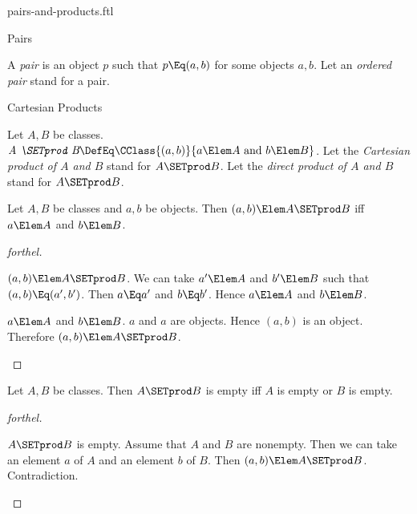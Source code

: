 \documentclass{stex}
\begin{document}
\begin{smodule}{pairs-and-products.ftl}

\begin{sfragment}{Pairs}
  \begin{definition}[forthel,for=ordered pair]
    A \emph{pair} is an object $p$ such that $p \Eq (a, b)$ for some objects $a, b$.
    Let an \emph{ordered pair} stand for a pair.
  \end{definition}
\end{sfragment}

\begin{sfragment}{Cartesian Products}
  \begin{definition}[forthel,for={SETprod,Cartesian product,direct product}]
    Let $A, B$ be classes.
    $\emph{A \SETprod B} \DefEq \CClass{(a, b)}{a \Elem A\text{ and }b \Elem B}$.
    Let the \emph{Cartesian product of $A$ and $B$} stand for $A \SETprod B$.
    Let the \emph{direct product of $A$ and $B$} stand for $A \SETprod B$.
  \end{definition}

  \begin{proposition}[forthel]
    Let $A, B$ be classes and $a, b$ be objects.
    Then $(a, b) \Elem A \SETprod B$ iff $a \Elem A$ and $b \Elem B$.
  \end{proposition}
  \begin{proof}[forthel]
    \begin{case}{$(a, b) \Elem A \SETprod B$.}
      We can take $a' \Elem A$ and $b' \Elem B$ such that $(a, b) \Eq (a', b')$.
      Then $a \Eq a'$ and $b \Eq b'$.
      Hence $a \Elem A$ and $b \Elem B$.
    \end{case}

    \begin{case}{$a \Elem A$ and $b \Elem B$.}
      $a$ and $a$ are objects.
      Hence $(a, b)$ is an object.
      Therefore $(a, b) \Elem A \SETprod B$.
    \end{case}
  \end{proof}

  \begin{proposition}[forthel]
    Let $A, B$ be classes.
    Then $A \SETprod B$ is empty iff $A$ is empty or $B$ is empty.
  \end{proposition}
  \begin{proof}[forthel]
    \begin{case}{$A \SETprod B$ is empty.}
      Assume that $A$ and $B$ are nonempty.
      Then we can take an element $a$ of $A$ and an element $b$ of $B$.
      Then $(a, b) \Elem A \SETprod B$.
      Contradiction.
    \end{case}


\end{proof}
\end{sfragment}
\end{smodule}
\end{document}
